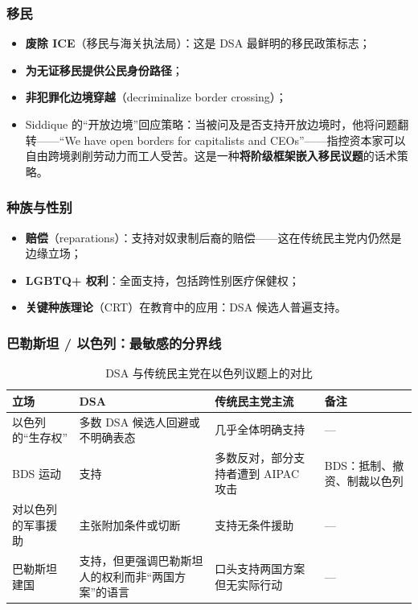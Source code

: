 \documentclass[12pt,a4paper]{ctexart}
\begin{document}
\subsubsection{移民}

\begin{itemize}
  \item \textbf{废除 ICE}（移民与海关执法局）：这是 DSA 最鲜明的移民政策标志；
  \item \textbf{为无证移民提供公民身份路径}；
  \item \textbf{非犯罪化边境穿越}（decriminalize border crossing）；
  \item Siddique 的``开放边境''回应策略：当被问及是否支持开放边境时，他将问题翻转——``We have open borders for capitalists and CEOs''——指控资本家可以自由跨境剥削劳动力而工人受苦。这是一种\textbf{将阶级框架嵌入移民议题}的话术策略。
\end{itemize}

\subsubsection{种族与性别}

\begin{itemize}
  \item \textbf{赔偿}（reparations）：支持对奴隶制后裔的赔偿——这在传统民主党内仍然是边缘立场；
  \item \textbf{LGBTQ+ 权利}：全面支持，包括跨性别医疗保健权；
  \item \textbf{关键种族理论}（CRT）在教育中的应用：DSA 候选人普遍支持。
\end{itemize}

\subsubsection{巴勒斯坦 / 以色列：最敏感的分界线}

\begin{table}[h]
\centering
\caption{DSA 与传统民主党在以色列议题上的对比}
\begin{tabular}{@{}lp{4.4cm}p{4.4cm}p{4.6cm}@{}}
\toprule
\textbf{立场} & \textbf{DSA} & \textbf{传统民主党主流} & \textbf{备注} \\
\midrule
以色列的``生存权'' & 多数 DSA 候选人回避或不明确表态 & 几乎全体明确支持 & --- \\
BDS 运动 & 支持 & 多数反对，部分支持者遭到 AIPAC 攻击 & BDS：抵制、撤资、制裁以色列 \\
对以色列的军事援助 & 主张附加条件或切断 & 支持无条件援助 & --- \\
巴勒斯坦建国 & 支持，但更强调巴勒斯坦人的权利而非``两国方案''的语言 & 口头支持两国方案但无实际行动 & --- \\
\bottomrule
\end{tabular}
\end{table}
\end{document}
